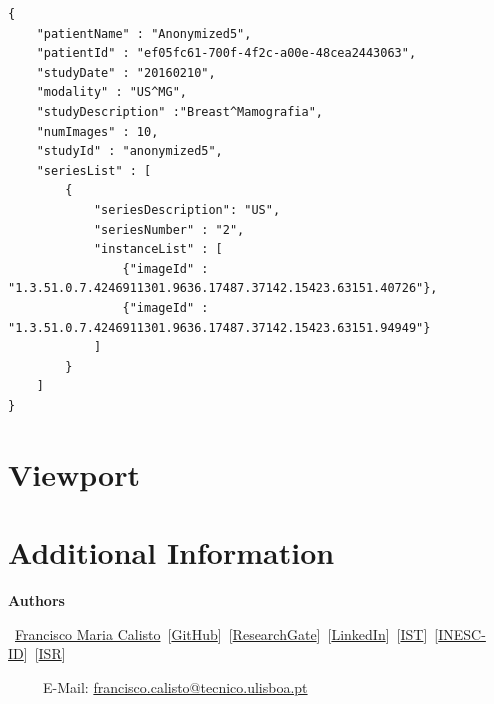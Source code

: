 \documentclass{tufte-book} %
\begin{document}
\begin{lstlisting}
{
    "patientName" : "Anonymized5",
    "patientId" : "ef05fc61-700f-4f2c-a00e-48cea2443063",
    "studyDate" : "20160210",
    "modality" : "US^MG",
    "studyDescription" :"Breast^Mamografia",
    "numImages" : 10,
    "studyId" : "anonymized5",
    "seriesList" : [
        {
            "seriesDescription": "US",
            "seriesNumber" : "2",
            "instanceList" : [
                {"imageId" : "1.3.51.0.7.4246911301.9636.17487.37142.15423.63151.40726"},
                {"imageId" : "1.3.51.0.7.4246911301.9636.17487.37142.15423.63151.94949"}
            ]
        }
    ]
}
\end{lstlisting}



\chapter{Viewport}


\chapter{Additional Information}

\textbf{Authors}

\textemdash~\href{http://franciscocalisto.me/}{Francisco Maria Calisto}~[\href{https://github.com/FMCalisto}{GitHub}]~[\href{https://www.researchgate.net/profile/Francisco_Maria_Calisto}{ResearchGate}]~[\href{https://www.linkedin.com/in/fmcalisto/}{LinkedIn}]~[\href{http://web.tecnico.ulisboa.pt/francisco.calisto/}{IST}]~[\href{http://www.inesc-id.pt/member/15650/}{INESC-ID}]~[\href{http://welcome.isr.tecnico.ulisboa.pt/author/franciscomariagalambaferraricalisto/}{ISR}]

~~~~~E-Mail: \href{mailto:francisco.calisto@tecnico.ulisboa.pt}{francisco.calisto@tecnico.ulisboa.pt}



\printindex
\end{document}
